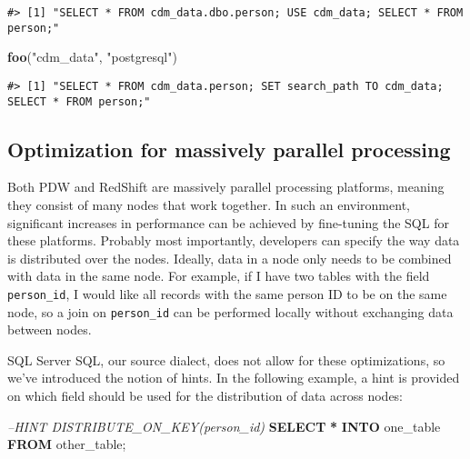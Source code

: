 \documentclass[
]{article}
\newenvironment{Shaded}{\begin{snugshade}}{\end{snugshade}}
\newcommand{\CommentTok}[1]{\textcolor[rgb]{0.56,0.35,0.01}{\textit{#1}}}
\newcommand{\KeywordTok}[1]{\textcolor[rgb]{0.13,0.29,0.53}{\textbf{#1}}}
\newcommand{\NormalTok}[1]{#1}
\newcommand{\OperatorTok}[1]{\textcolor[rgb]{0.81,0.36,0.00}{\textbf{#1}}}
\newcommand{\StringTok}[1]{\textcolor[rgb]{0.31,0.60,0.02}{#1}}
\begin{document}
\begin{verbatim}
#> [1] "SELECT * FROM cdm_data.dbo.person; USE cdm_data; SELECT * FROM person;"
\end{verbatim}

\begin{Shaded}
\begin{Highlighting}[]
\KeywordTok{foo}\NormalTok{(}\StringTok{"cdm_data"}\NormalTok{, }\StringTok{"postgresql"}\NormalTok{)}
\end{Highlighting}
\end{Shaded}

\begin{verbatim}
#> [1] "SELECT * FROM cdm_data.person; SET search_path TO cdm_data; SELECT * FROM person;"
\end{verbatim}

\hypertarget{optimization-for-massively-parallel-processing}{%
\subsection{Optimization for massively parallel
processing}\label{optimization-for-massively-parallel-processing}}

Both PDW and RedShift are massively parallel processing platforms,
meaning they consist of many nodes that work together. In such an
environment, significant increases in performance can be achieved by
fine-tuning the SQL for these platforms. Probably most importantly,
developers can specify the way data is distributed over the nodes.
Ideally, data in a node only needs to be combined with data in the same
node. For example, if I have two tables with the field
\texttt{person\_id}, I would like all records with the same person ID to
be on the same node, so a join on \texttt{person\_id} can be performed
locally without exchanging data between nodes.

SQL Server SQL, our source dialect, does not allow for these
optimizations, so we've introduced the notion of hints. In the following
example, a hint is provided on which field should be used for the
distribution of data across nodes:

\begin{Shaded}
\begin{Highlighting}[]
\CommentTok{--HINT DISTRIBUTE_ON_KEY(person_id)}
\KeywordTok{SELECT} \OperatorTok{*} \KeywordTok{INTO}\NormalTok{ one_table }\KeywordTok{FROM}\NormalTok{ other_table;}
\end{Highlighting}
\end{Shaded}
\end{document}

